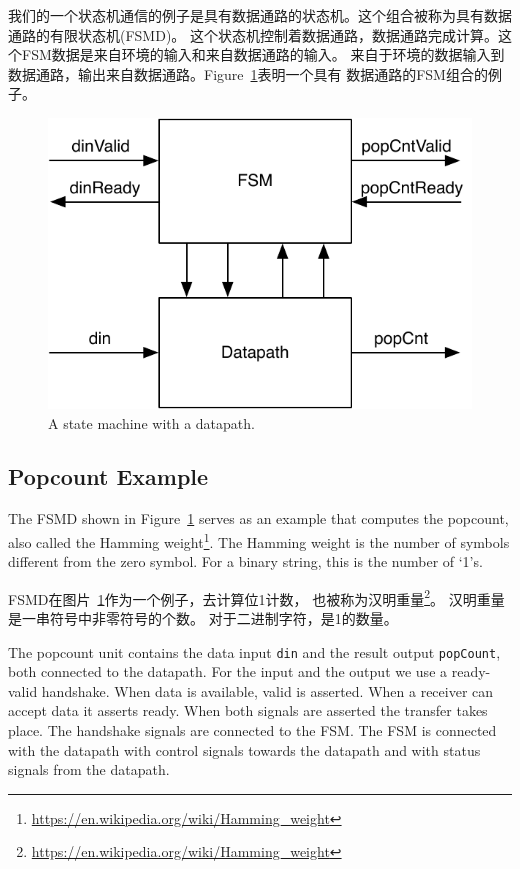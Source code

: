 \documentclass[%
    10pt,
    headinclude, footexclude,
    openright, %
    notitlepage,
    cleardoubleempty,
    headsepline,
    pointlessnumbers,
    bibtotoc, idxtotoc,
    ]{scrbook}
\newcommand{\code}[1]{{\small{\texttt{#1}}}}
\newcommand{\scale}{0.7}
\newcommand{\myref}[2]{\href{#1}{#2}}
\renewcommand{\myref}[2]{{#2}{\footnote{\url{#1}}}}
\begin{document}
{我们的一个状态机通信的例子是具有数据通路的状态机。这个组合被称为具有数据通路的有限状态机(FSMD)。
这个状态机控制着数据通路，数据通路完成计算。这个FSM数据是来自环境的输入和来自数据通路的输入。
来自于环境的数据输入到数据通路，输出来自数据通路。Figure~\ref{fig:popcnt-fsmd}表明一个具有
数据通路的FSM组合的例子。


\begin{figure}
  \centering
  \includegraphics[scale=\scale]{figures/popcnt-fsmd}
  \caption{A state machine with a datapath.}
  \label{fig:popcnt-fsmd}
\end{figure}

\subsection{Popcount Example}

The FSMD shown in Figure~\ref{fig:popcnt-fsmd} serves as an example that computes the
popcount, also called the \myref{https://en.wikipedia.org/wiki/Hamming_weight}{Hamming weight}.
The Hamming weight is the number of symbols different from the zero symbol.
For a binary string, this is the number of `1's.

FSMD在图片~\ref{fig:popcnt-fsmd}作为一个例子，去计算位1计数，
也被称为\myref{https://en.wikipedia.org/wiki/Hamming_weight}{汉明重量}。
汉明重量是一串符号中非零符号的个数。
对于二进制字符，是1的数量。

The popcount unit contains the data input \code{din} and the result output \code{popCount},
both connected to the datapath. For the input and the output we use a ready-valid handshake.
When data is available, valid is asserted. When a receiver can accept data it asserts ready.
When both signals are asserted the transfer takes place. The handshake signals are connected
to the FSM. The FSM is connected with the datapath with control signals towards the datapath
and with status signals from the datapath.

}
\end{document}
